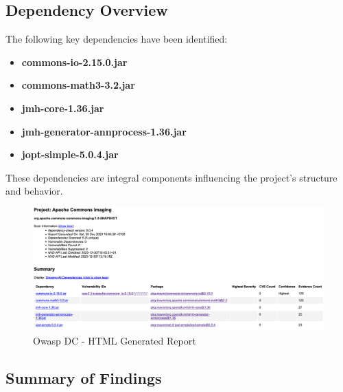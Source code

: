 \documentclass[sigconf]{acmart}
\begin{document}
\subsection{Dependency Overview}

The following key dependencies have been identified:

\begin{itemize}
    \item \textbf{commons-io-2.15.0.jar}
    \item \textbf{commons-math3-3.2.jar}
    \item \textbf{jmh-core-1.36.jar}
    \item \textbf{jmh-generator-annprocess-1.36.jar}
    \item \textbf{jopt-simple-5.0.4.jar}
\end{itemize}

These dependencies are integral components influencing the project's structure and behavior.


\begin{figure}[h!]
    \centering
    \includegraphics[width=1\linewidth,height=0.7\linewidth]{reportOwaspDC.png}
    \caption{Owasp DC - HTML Generated Report}
    \label{fig:enter-label}
\end{figure}


\subsection{Summary of Findings}
\end{document}
